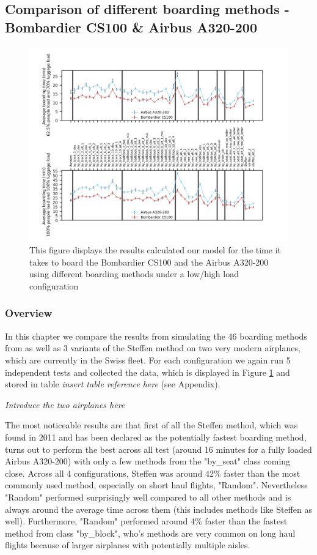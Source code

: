 \documentclass[11pt]{article}
\begin{document}
\subsection{Comparison of different boarding methods - Bombardier CS100 \& Airbus A320-200}
\begin{figure}
	\includegraphics[width=\linewidth]{../../code/AirplaneBoarding/data/figure2/figure2.png}
	\caption{This figure displays the results calculated our model for the time it takes to board the Bombardier CS100 and the Airbus A320-200 using different boarding methods under a low/high load configuration}
	\label{figure2}
\end{figure}

 
 \subsubsection{Overview}
 In this chapter we compare the results from simulating the 46 boarding methods from \cite{beus} as well as 3 variants of the Steffen method \cite{steffen} on two very modern airplanes, which are currently in the Swiss fleet. For each configuration we again run 5 independent tests and collected the data, which is displayed in Figure \ref{figure2} and stored in table \textit{insert table reference here} (see Appendix). 
 
 \textit{Introduce the two airplanes here}
 
 The most noticeable results are that first of all the Steffen method, which was found in 2011 and has been declared as the potentially fastest boarding method, turns out to perform the best across all test (around 16 minutes for a fully loaded Airbus A320-200) with only a few methods from the "by\_seat" class coming close. Across all 4 configurations, Steffen was around 42\% faster than the most commonly used method, especially on short haul flights, "Random". Nevertheless "Random" performed surprisingly well compared to all other methods and is always around the average time across them (this includes methods like Steffen as well). Furthermore, "Random" performed around 4\% faster than the fastest method from class "by\_block", who's methods are very common on long haul flights because of larger airplanes with potentially multiple aisles.
 
\end{document}
